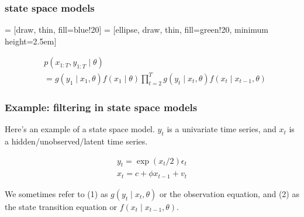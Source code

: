 \documentclass{beamer}
\begin{document}
\begin{frame}[fragile]
\frametitle{state space models}

 = [draw, thin, fill=blue!20]
 = [ellipse, draw, thin, fill=green!20, minimum height=2.5em]

\begin{figure}
\end{figure}


\begin{align*}
&p(x_{1:T}, y_{1:T} \mid \theta) \\
&= g(y_1 \mid x_1, \theta) f(x_1 \mid \theta) \prod_{t=2}^T g(y_t \mid x_t, \theta) f(x_t \mid x_{t-1}, \theta)
\end{align*}

\end{frame}
\begin{frame}[fragile]
\frametitle{Example: filtering in state space models}

Here's an example of a state space model. $y_t$ is a univariate time series, and $x_t$ is a hidden/unobserved/latent time series.
\newline

\begin{gather}
y_t = \exp(x_t / 2) \epsilon_t \\
x_t = c + \phi x_{t-1} + v_t
\end{gather}

We sometimes refer to (1) as $g(y_t \mid x_t, \theta)$ or the observation equation, and (2) as the state transition equation or $f(x_t \mid x_{t-1}, \theta)$.
\end{frame}
\end{document}
